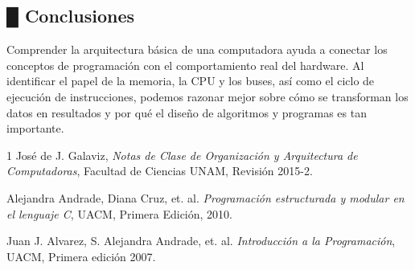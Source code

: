 \documentclass[11pt,spanish]{article}
\begin{document}
\subsection*{\color{celestialblue}█ \quad{}\color{black}Conclusiones}

Comprender la arquitectura básica de una computadora ayuda a conectar los
conceptos de programación con el comportamiento real del hardware. Al
identificar el papel de la memoria, la CPU y los buses, así como el ciclo
de ejecución de instrucciones, podemos razonar mejor sobre cómo se
transforman los datos en resultados y por qué el diseño de algoritmos y
programas es tan importante.
\begin{thebibliography}{1}
José de J. Galaviz, \emph{Notas de Clase de Organización
y Arquitectura de Computadoras}, Facultad de Ciencias UNAM, Revisión
2015-2.

Alejandra Andrade, Diana Cruz, et. al. \emph{Programación
estructurada y modular en el lenguaje C}, UACM, Primera Edición, 2010. 

Juan J. Alvarez, S. Alejandra Andrade, et. al. \emph{Introducción
a la Programación}, UACM, Primera edición 2007.
\end{thebibliography}
\end{document}
